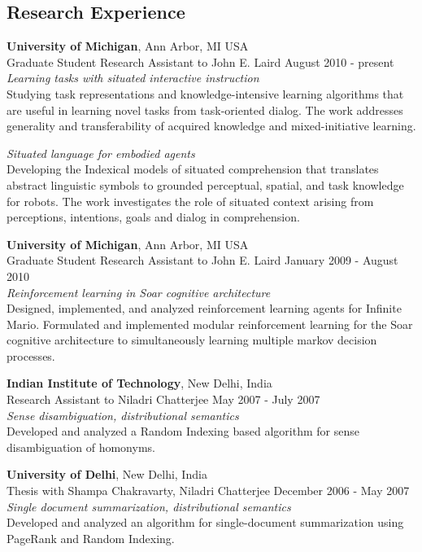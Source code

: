 \documentclass[margin,line,11pt]{res}
\begin{document}
\begin{resume}
\section{\sc Research Experience}
{\bf University of Michigan}, Ann Arbor, MI USA \\ {Graduate Student
  Research Assistant} to John E. Laird \hfill August 2010 -
present\\ \emph{Learning tasks with situated interactive instruction}
\\ Studying task representations and knowledge-intensive learning
algorithms that are useful in learning novel tasks from task-oriented
dialog. The work addresses generality and transferability of acquired
knowledge and mixed-initiative learning. 

\emph{Situated language for embodied agents}\\ Developing the
Indexical models of situated comprehension that translates abstract
linguistic symbols to grounded perceptual, spatial, and task knowledge
for robots. The work investigates the role of situated context arising
from perceptions, intentions, goals and dialog in comprehension.


{\bf University of Michigan}, Ann Arbor, MI USA \\
{Graduate Student Research Assistant} to John E. Laird \hfill January 2009 - August 2010\\
\emph{Reinforcement learning in Soar cognitive architecture}\\
 Designed, implemented, and analyzed reinforcement learning agents for
 Infinite Mario. Formulated and implemented modular reinforcement learning for the Soar cognitive
 architecture to simultaneously learning multiple markov decision
 processes. 

\pagebreak

{\bf Indian Institute of Technology}, New Delhi, India \\
{Research Assistant} to Niladri Chatterjee \hfill May 2007 - July 2007\\
\emph{Sense disambiguation, distributional semantics}\\
Developed and analyzed a Random Indexing based algorithm for sense disambiguation of homonyms.

{\bf University of Delhi}, New Delhi, India \\
{Thesis} with Shampa Chakravarty, Niladri Chatterjee \hfill December 2006 - May 2007\\
\emph{Single document summarization, distributional semantics}\\
Developed and analyzed an algorithm for single-document summarization using PageRank and Random Indexing.



\end{resume}
\end{document}
